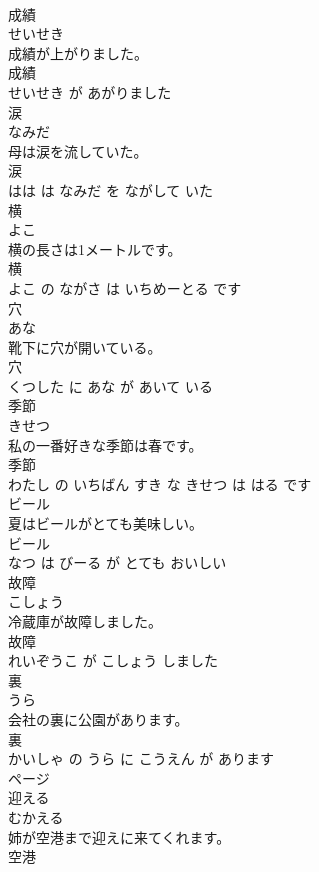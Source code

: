 \documentclass[8pt]{extreport}
\begin{document}
\begin{CJK}{UTF8}{min}
\\	成績	
\\	せいせき			
\\	成績が上がりました。	
\\	成績 
\\	せいせき が あがりました			
\\	涙	
\\	なみだ			
\\	母は涙を流していた。	
\\	涙 
\\	はは は なみだ を ながして いた			
\\	横	
\\	よこ			
\\	横の長さは1メートルです。	
\\	横 
\\	よこ の ながさ は いちめーとる です			
\\	穴	
\\	あな			
\\	靴下に穴が開いている。	
\\	穴 
\\	くつした に あな が あいて いる			
\\	季節	
\\	きせつ			
\\	私の一番好きな季節は春です。	
\\	季節 
\\	わたし の いちばん すき な きせつ は はる です			
\\	ビール	
\\	夏はビールがとても美味しい。	
\\	ビール 
\\	なつ は びーる が とても おいしい			
\\	故障	
\\	こしょう			
\\	冷蔵庫が故障しました。	
\\	故障 
\\	れいぞうこ が こしょう しました			
\\	裏	
\\	うら			
\\	会社の裏に公園があります。	
\\	裏 
\\	かいしゃ の うら に こうえん が あります			
\\	ページ	
\\	迎える	
\\	むかえる			
\\	姉が空港まで迎えに来てくれます。	
\\	空港 

\end{CJK}
\end{document}
